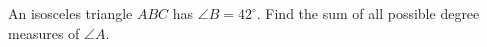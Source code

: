 An isosceles triangle $ABC$ has $\angle B=42^\circ$. Find the sum of all possible degree measures of $\angle A$.

